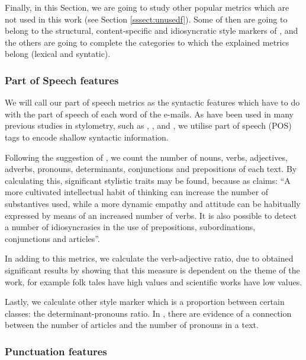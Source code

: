 Finally, in this Section, we are going to study other popular metrics which are not used in this work (see Section \ref{sssect:unusedf}). Some of then are going to belong to the structural, content-specific and idiosyncratic style markers of \cite{abbasi2008writeprints}, and the others are going to complete the categories to which the explained metrics belong (lexical and syntatic).

\subsubsection{Part of Speech features}\label{sssect:posf}

We will call our part of speech metrics as the syntactic features which have to do with the part of speech of each word of the e-mails. As have been used in many previous studies in stylometry, such as \cite{argamon1998style}, \cite{zhao2007searching}, \cite{ott2011finding} and \cite{cfgstylo}, we utilise part of speech (POS) tags to encode shallow syntactic information.

Following the suggestion of \cite{holmes1985analysis}, we count the number of nouns, verbs, adjectives, adverbs, pronouns, determinants, conjunctions and prepositions of each text. By calculating this, significant stylistic traits may be found, because as \cite{somers1966statistical} claims: ``A more cultivated intellectual habit of thinking can increase the number of substantives used, while a more dynamic empathy and attitude can be habitually expressed by means of an increased number of verbs. It is also possible to detect a number of idiosyncrasies in the use of prepositions, subordinations, conjunctions and articles''.

In adding to this metrics, we calculate the verb-adjective ratio, due to \cite{antosch1969diagnosis} obtained significant results by showing that this measure is dependent on the theme of the work, for example folk tales have high values and scientific works have low values.

Lastly, we calculate other style marker which is a proportion between certain classes: the determinant-pronouns ratio. In \cite{brainerd1974weighting}, there are evidence of a connection between the number of articles and the number of pronouns in a text.

\subsubsection{Punctuation features}\label{sssect:punctf}

